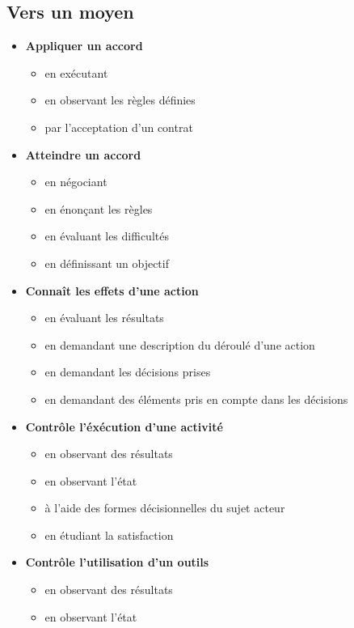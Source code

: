 \documentclass[8pt,a4paper]{article}
\begin{document}
\subsection{Vers un moyen}
\begin{itemize}
\item \textbf{Appliquer un accord}
\begin{itemize}
\item en exécutant
\item en observant les règles définies
\item par l'acceptation d'un contrat
\\ 
 \end{itemize}
\item \textbf{Atteindre un accord}
\begin{itemize}
\item en négociant
\item en énonçant les règles
\item en évaluant les difficultés
\item en définissant un objectif
\\ 
 \end{itemize}
\item \textbf{Connaît les effets d'une action}
\begin{itemize}
\item en évaluant les résultats
\item en demandant une description du déroulé d'une action
\item en demandant les décisions prises
\item en demandant des éléments pris en compte dans les décisions
\\ 
 \end{itemize}
\item \textbf{Contrôle l'éxécution d'une activité}
\begin{itemize}
\item en observant des résultats
\item en observant l'état
\item à l'aide des formes décisionnelles du sujet acteur
\item en étudiant la satisfaction
\\ 
 \end{itemize}
\item \textbf{Contrôle l'utilisation d'un outils}
\begin{itemize}
\item en observant des résultats
\item en observant l'état

\end{itemize}
\end{itemize}
\end{document}
